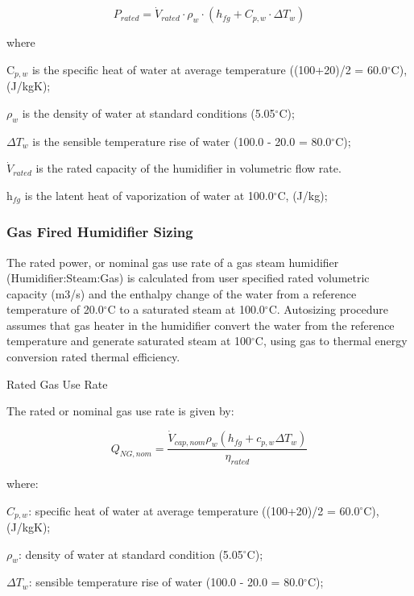 \begin{equation}
{P_{rated}} = {\dot V_{rated}} \cdot {\rho_w} \cdot \left( {{h_{fg}} + {C_{p,w}} \cdot \Delta {T_w}} \right)
\end{equation}

where

C\(_{p,w}\) is the specific heat of water at average temperature ((100+20)/2 = 60.0\(^{\circ}\)C), (J/kgK);

\(\rho_{w}\) is the density of water at standard conditions (5.05\(^{\circ}\)C);

\(\Delta T_{w}\) is the sensible temperature rise of water (100.0 - 20.0 = 80.0\(^{\circ}\)C);

\({\dot V_{rated}}\) is the rated capacity of the humidifier in volumetric flow rate.

h\(_{fg}\) is the latent heat of vaporization of water at 100.0\(^{\circ}\)C, (J/kg);

\subsubsection{Gas Fired Humidifier Sizing}\label{gas-fired-humidifier-sizing}

The rated power, or nominal gas use rate of a gas steam humidifier (Humidifier:Steam:Gas) is calculated from user specified rated volumetric capacity (m3/s) and the enthalpy change of the water from a reference temperature of 20.0\(^{\circ}\)C to a saturated steam at 100.0\(^{\circ}\)C. Autosizing procedure assumes that gas heater in the humidifier convert the water from the reference temperature and generate saturated steam at 100\(^{\circ}\)C, using gas to thermal energy conversion rated thermal efficiency.

Rated Gas Use Rate

The rated or nominal gas use rate is given by:

\begin{equation}
Q_{NG,nom} = \frac{\dot{V}_{cap,nom}\rho_w\left(h_{fg}+c_{p,w}\Delta T_w\right)}{\eta_{rated}}
\end{equation}

where:

\(C_{p,w}\): specific heat of water at average temperature ((100+20)/2 = 60.0\(^{\circ}\)C), (J/kgK);

\(\rho_{w}\): density of water at standard condition (5.05\(^{\circ}\)C);

\(\Delta T_{w}\): sensible temperature rise of water (100.0 - 20.0 = 80.0\(^{\circ}\)C);

